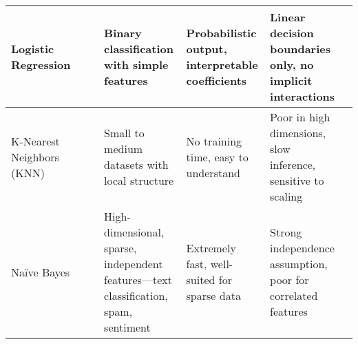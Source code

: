 \documentclass[12pt,openany]{book}
\newcommand{\cmark}{{\color{green!60!black}\ding{51}}} %
\newcommand{\xmark}{{\color{red!80!black}\ding{55}}}   %
\newcommand{\speedfast}{\textcolor{green!60!black}{\ding{108}}}    %
\newcommand{\speedslow}{\textcolor{red!70!black}{\ding{115}}}     %
\begin{document}
\begin{table}[H]
{\begin{tabular}{|p{2.6cm}|c|c|p{3.6cm}|p{3cm}|p{3cm}|c|}
        \hline
        Logistic Regression & \xmark & \cmark & Binary classification with simple features & Probabilistic output, interpretable coefficients & Linear decision boundaries only, no implicit interactions & \speedfast \\
        \hline
        K-Nearest Neighbors (KNN) & \cmark & \cmark & Small to medium datasets with local structure & No training time, easy to understand & Poor in high dimensions, slow inference, sensitive to scaling & \speedslow \\
        \hline
        Naïve Bayes & \xmark & \cmark & High-dimensional, sparse, independent features—text classification, spam, sentiment & Extremely fast, well-suited for sparse data & Strong independence assumption, poor for correlated features & \speedfast \\
        \hline
    \end{tabular}
    }
\end{table}
\end{document}
